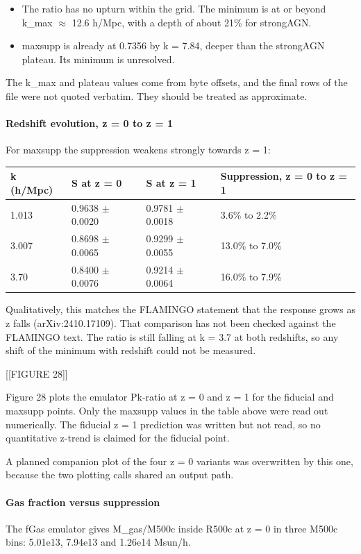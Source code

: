 \documentclass[11pt,a4paper]{article}
\begin{document}
\begin{itemize}
  \item The ratio has no upturn within the grid. The minimum is at or beyond k\_max $\approx$ 12.6 h/Mpc, with a depth of about 21\% for strongAGN.
  \item maxsupp is already at 0.7356 by k = 7.84, deeper than the strongAGN plateau. Its minimum is unresolved.
\end{itemize}
The k\_max and plateau values come from byte offsets, and the final rows of the file were not quoted verbatim. They should be treated as approximate.

\paragraph{Redshift evolution, z = 0 to z = 1}
For maxsupp the suppression weakens strongly towards z = 1:

\begin{longtable}{@{}p{}p{}p{}p{}@{}}
\toprule
\textbf{k (h/Mpc)} & \textbf{S at z = 0} & \textbf{S at z = 1} & \textbf{Suppression, z = 0 to z = 1} \\ \midrule \endhead
1.013 & 0.9638 $\pm$ 0.0020 & 0.9781 $\pm$ 0.0018 & 3.6\% to 2.2\% \\
3.007 & 0.8698 $\pm$ 0.0065 & 0.9299 $\pm$ 0.0055 & 13.0\% to 7.0\% \\
3.70 & 0.8400 $\pm$ 0.0076 & 0.9214 $\pm$ 0.0064 & 16.0\% to 7.9\% \\
\bottomrule\end{longtable}
Qualitatively, this matches the FLAMINGO statement that the response grows as z falls (arXiv:2410.17109). That comparison has not been checked against the FLAMINGO text. The ratio is still falling at k = 3.7 at both redshifts, so any shift of the minimum with redshift could not be measured.

[[FIGURE 28]]

Figure 28 plots the emulator Pk-ratio at z = 0 and z = 1 for the fiducial and maxsupp points. Only the maxsupp values in the table above were read out numerically. The fiducial z = 1 prediction was written but not read, so no quantitative z-trend is claimed for the fiducial point.

A planned companion plot of the four z = 0 variants was overwritten by this one, because the two plotting calls shared an output path.

\paragraph{Gas fraction versus suppression}
The fGas emulator gives M\_gas/M500c inside R500c at z = 0 in three M500c bins: 5.01e13, 7.94e13 and 1.26e14 Msun/h.
\end{document}
